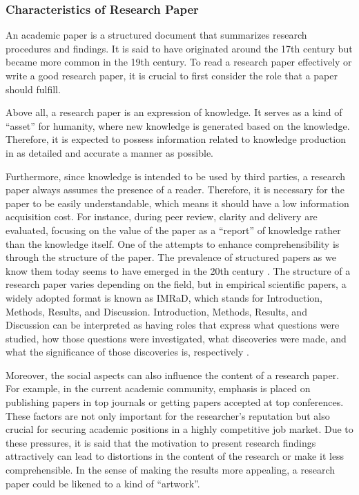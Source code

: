 \documentclass{book}
\begin{document}
\subsubsection{Characteristics of Research Paper}
An academic paper is a structured document that summarizes research procedures and findings. It is said to have originated around the 17th century but became more common in the 19th century. To read a research paper effectively or write a good research paper, it is crucial to first consider the role that a paper should fulfill. 

Above all, a research paper is an expression of knowledge. It serves as a kind of ``asset'' for humanity, where new knowledge is generated based on the knowledge. Therefore, it is expected to possess information related to knowledge production in as detailed and accurate a manner as possible.

Furthermore, since knowledge is intended to be used by third parties, a research paper always assumes the presence of a reader. Therefore, it is necessary for the paper to be easily understandable, which means it should have a low information acquisition cost. For instance, during peer review, clarity and delivery are evaluated, focusing on the value of the paper as a ``report'' of knowledge rather than the knowledge itself. One of the attempts to enhance comprehensibility is through the structure of the paper. The prevalence of structured papers as we know them today seems to have emerged in the 20th century \cite{harmon1989structure}. 
The structure of a research paper varies depending on the field, but in empirical scientific papers, a widely adopted format is known as IMRaD, which stands for Introduction, Methods, Results, and Discussion. Introduction, Methods, Results, and Discussion can be interpreted as having roles that express what questions were studied, how those questions were investigated, what discoveries were made, and what the significance of those discoveries is, respectively \cite{gastel2022write}.

Moreover, the social aspects can also influence the content of a research paper. For example, in the current academic community, emphasis is placed on publishing papers in top journals or getting papers accepted at top conferences. These factors are not only important for the researcher's reputation but also crucial for securing academic positions in a highly competitive job market. Due to these pressures, it is said that the motivation to present research findings attractively can lead to distortions in the content of the research or make it less comprehensible. In the sense of making the results more appealing, a research paper could be likened to a kind of ``artwork''.
\end{document}
